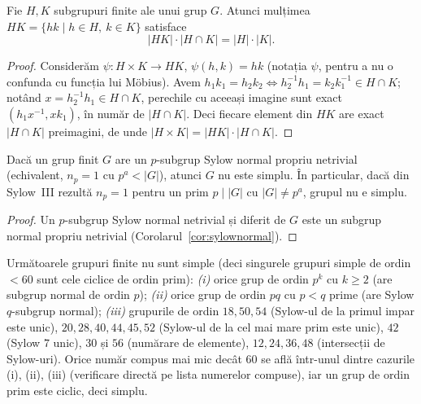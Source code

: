 \begin{lema}\label{lema:produsHK}
Fie $H,K$ subgrupuri finite ale unui grup $G$. Atunci mulțimea $HK=\{hk\mid h\in H,\ k\in K\}$ satisface
\[
|HK|\cdot|H\cap K|=|H|\cdot|K|.
\]
\end{lema}

\begin{proof}
Considerăm $\psi:H\times K\to HK$, $\psi(h,k)=hk$ (notația $\psi$, pentru a nu o confunda cu funcția lui Möbius). Avem $h_1k_1=h_2k_2\iff h_2^{-1}h_1=k_2k_1^{-1}\in H\cap K$; notând $x=h_2^{-1}h_1\in H\cap K$, perechile cu aceeași imagine sunt exact $(h_1x^{-1},xk_1)$, în număr de $|H\cap K|$. Deci fiecare element din $HK$ are exact $|H\cap K|$ preimagini, de unde $|H\times K|=|HK|\cdot|H\cap K|$.
\end{proof}

\begin{lema}\label{lema:sylownormalsimplu}
Dacă un grup finit $G$ are un $p$-subgrup Sylow normal propriu netrivial (echivalent, $n_p=1$ cu $p^a<|G|$), atunci $G$ nu este simplu. În particular, dacă din Sylow~III rezultă $n_p=1$ pentru un prim $p\mid|G|$ cu $|G|\neq p^a$, grupul nu e simplu.
\end{lema}

\begin{proof}
Un $p$-subgrup Sylow normal netrivial și diferit de $G$ este un subgrup normal propriu netrivial (Corolarul~\ref{cor:sylownormal}).
\end{proof}

\begin{teorema}\label{teo:simplemici}
Următoarele grupuri finite nu sunt simple (deci singurele grupuri simple de ordin $<60$ sunt cele ciclice de ordin prim):
\emph{(i)} orice grup de ordin $p^k$ cu $k\ge2$ (are subgrup normal de ordin $p$);
\emph{(ii)} orice grup de ordin $pq$ cu $p<q$ prime (are Sylow $q$-subgrup normal);
\emph{(iii)} grupurile de ordin $18,50,54$ (Sylow-ul de la primul impar este unic), $20,28,40,44,45,52$ (Sylow-ul de la cel mai mare prim este unic), $42$ (Sylow $7$ unic), $30$ și $56$ (numărare de elemente), $12,24,36,48$ (intersecții de Sylow-uri).
Orice număr compus mai mic decât $60$ se află într-unul dintre cazurile (i), (ii), (iii) (verificare directă pe lista numerelor compuse), iar un grup de ordin prim este ciclic, deci simplu.
\end{teorema}

